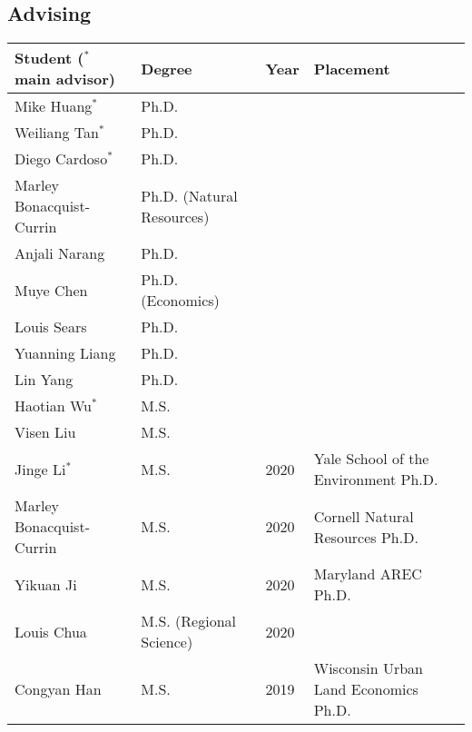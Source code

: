 \documentclass{res} %
\begin{document}
\begin{resume}
\section{Advising}
\vspace{.1in}
\begin{tabular}{@{}llll@{}}
\toprule
Student ($^*$ main advisor)                 & Degree                    & Year & Placement                               \\ \midrule
Mike Huang$^*$           & Ph.D.                     &      &                                         \\
Weiliang Tan$^*$         & Ph.D.                     &      &                                         \\
Diego Cardoso$^*$        & Ph.D.                     &      &                                         \\ 
Marley Bonacquist-Currin & Ph.D. (Natural Resources) &      &                                         \\
Anjali Narang            & Ph.D.                     &      &                                         \\
Muye Chen                & Ph.D. (Economics)         &      &                                         \\
Louis Sears              & Ph.D.                     &      &                                         \\
Yuanning Liang           & Ph.D.                     &      &                                         \\
Lin Yang                 & Ph.D.                     &      &                                         \\
Haotian Wu$^*$           & M.S.                      &      &                                         \\
Visen Liu                & M.S.                      &      &                                         \\ 
Jinge Li$^*$             & M.S.                      & 2020 & Yale School of the Environment Ph.D.         \\
Marley Bonacquist-Currin & M.S.                      & 2020 & Cornell Natural Resources  Ph.D.\\
Yikuan Ji                & M.S.                      & 2020 & Maryland AREC Ph.D.                           \\
Louis Chua               & M.S. (Regional Science)   & 2020 &                                         \\
Congyan Han              & M.S.                      & 2019 & Wisconsin Urban Land Economics Ph.D.         
\end{tabular}


\end{resume}
\end{document}
